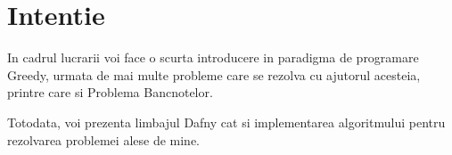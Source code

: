 \chapter*{Intentie} 

In cadrul lucrarii voi face o scurta introducere in paradigma de programare Greedy, urmata de mai multe probleme care se rezolva cu ajutorul acesteia, printre care si Problema Bancnotelor.

Totodata, voi prezenta limbajul Dafny cat si implementarea algoritmului pentru rezolvarea problemei alese de mine. 